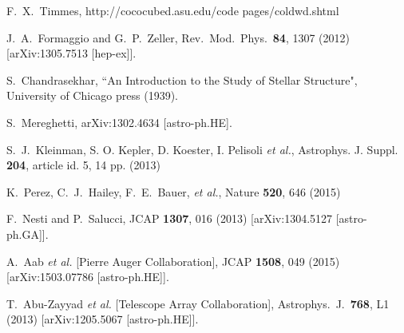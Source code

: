 \documentclass[twocolumn, preprintnumbers,amsmath,amssymb,prd, superscriptaddress]{revtex4}
\begin{document}
\begin{thebibliography}{99}
F.~X.~Timmes, http://cococubed.asu.edu/code pages/coldwd.shtml

  J.~A.~Formaggio and G.~P.~Zeller,
  Rev.\ Mod.\ Phys.\  {\bf 84}, 1307 (2012)
  [arXiv:1305.7513 [hep-ex]].


S.~Chandrasekhar, ``An Introduction to the Study of Stellar Structure", University of Chicago press (1939).

  S.~Mereghetti,
  arXiv:1302.4634 [astro-ph.HE].


S.~J.~Kleinman, S. O. Kepler, D. Koester, I. Pelisoli  {\it et al.}, Astrophys. J. Suppl. {\bf 204}, article
id. 5, 14 pp. (2013)

K.~Perez, C.~J.~Hailey, F.~E.~Bauer, {\it et al.}, Nature {\bf 520}, 646 (2015)

  F.~Nesti and P.~Salucci,
  JCAP {\bf 1307}, 016 (2013)
  [arXiv:1304.5127 [astro-ph.GA]].


  A.~Aab {\it et al.} [Pierre Auger Collaboration],
  JCAP {\bf 1508}, 049 (2015)
  [arXiv:1503.07786 [astro-ph.HE]].


  T.~Abu-Zayyad {\it et al.} [Telescope Array Collaboration],
  Astrophys.\ J.\  {\bf 768}, L1 (2013)
  [arXiv:1205.5067 [astro-ph.HE]].



\end{thebibliography}
\end{document}
